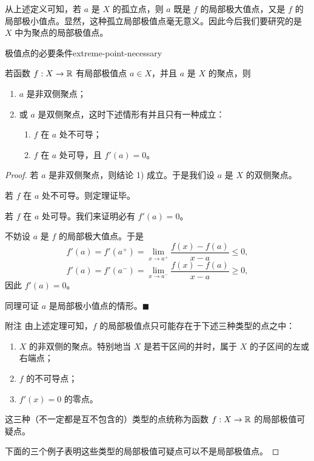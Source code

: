 从上述定义可知，若 $a$ 是 $X$ 的孤立点，则 $a$ 既是 $f$ 的局部极大值点，又是 $f$ 的局部极小值点。显然，这种孤立局部极值点毫无意义。因此今后我们要研究的是 $X$ 中为聚点的局部极值点。

\begin{mythm}{极值点的必要条件}{extreme-point-necessary}

若函数 $f:X\to\mathbb{R}$ 有局部极值点 $a\in X$，并且 $a$ 是 $X$ 的聚点，则

\begin{enumerate}[label=\arabic{enumi})]
\item $a$ 是非双侧聚点；
\item 或 $a$ 是双侧聚点，这时下述情形有并且只有一种成立：
\begin{enumerate}[label=(\roman{enumi})]
\item $f$ 在 $a$ 处不可导；
\item $f$ 在 $a$ 处可导，且 $f'(a)=0$。
\end{enumerate}
\end{enumerate}

\end{mythm}

\begin{proof}

若 $a$ 是非双侧聚点，则结论 1) 成立。于是我们设 $a$ 是 $X$ 的双侧聚点。

若 $f$ 在 $a$ 处不可导。则定理证毕。

若 $f$ 在 $a$ 处可导。我们来证明必有 $f'(a)=0$。

不妨设 $a$ 是 $f$ 的局部极大值点。于是
\[f'(a)=f'(a^{+})=\lim_{x\to a^{+}}\frac{f(x)-f(a)}{x-a}\leqslant0,\]
\[f'(a)=f'(a^{-})=\lim_{x\to a^{-}}\frac{f(x)-f(a)}{x-a}\geqslant0,\]
因此 $f'(a)=0$。

同理可证 $a$ 是局部极小值点的情形。$\blacksquare$

附注 由上述定理可知，$f$ 的局部极值点只可能存在于下述三种类型的点之中：

\begin{enumerate}[label=\arabic{enumi})]
\item $X$ 的非双侧的聚点。特别地当 $X$ 是若干区间的并时，属于 $X$ 的子区间的左或右端点；
\item $f$ 的不可导点；
\item $f'(x)=0$ 的零点。
\end{enumerate}

这三种（不一定都是互不包含的）类型的点统称为函数 $f:X\to\mathbb{R}$ 的局部极值可疑点。

下面的三个例子表明这些类型的局部极值可疑点可以不是局部极值点。

\end{proof}

